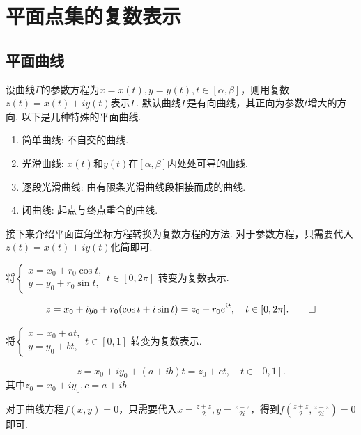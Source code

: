 \documentclass[openany,oneside]{ctexbook}
\begin{document}
\section{平面点集的复数表示}
\subsection{平面曲线}
设曲线$\Gamma$的参数方程为$x = x(t), y = y(t), t\in [\alpha, \beta]$，则用复数$z(t) = x(t) + iy(t)$表示$\Gamma$.
默认曲线$\Gamma$是有向曲线，其正向为参数$t$增大的方向.
以下是几种特殊的平面曲线.
\begin{enumerate}[label=(\arabic*), itemsep=0.5pt]
    \item 简单曲线: 不自交的曲线.
    \item 光滑曲线: $x(t)$和$y(t)$在$[\alpha, \beta]$内处处可导的曲线.
    \item 逐段光滑曲线: 由有限条光滑曲线段相接而成的曲线.
    \item 闭曲线: 起点与终点重合的曲线.
\end{enumerate}

接下来介绍平面直角坐标方程转换为复数方程的方法.
对于参数方程，只需要代入$z(t) = x(t) + iy(t)$化简即可.
\begin{example}
    将$
    \begin{cases}
        x = x_0 + r_0\cos t,\\
        y = y_0 + r_0\sin t,
    \end{cases} t \in [0, 2\pi]$
    转变为复数表示.
\end{example}
\begin{solution}
    \[
        z = x_0 + iy_0 + r_0(\cos t + i\sin t) = z_0 + r_0 e^{it}, \quad t \in [0, 2\pi].
    \qedhere\]
\end{solution}
\begin{example}
    将$\begin{cases}
        x = x_0 + at,\\ 
        y = y_0 + bt,
    \end{cases} t \in [0, 1]$
    转变为复数表示.
\end{example}
\begin{solution}
    \[
        z = x_0 + iy_0 + (a + ib)t = z_0 + ct, \quad t \in [0, 1].
    \]
    其中$z_0 = x_0 + iy_0, c = a + ib$.
\end{solution}  

对于曲线方程$f(x, y) = 0$，只需要代入$x = \frac{z + \overline{z}}{2}, y = \frac{z - \overline{z}}{2i}$，得到$f\left(\frac{z + \overline{z}}{2}, \frac{z - \overline{z}}{2i}\right) = 0$即可.
\end{document}

